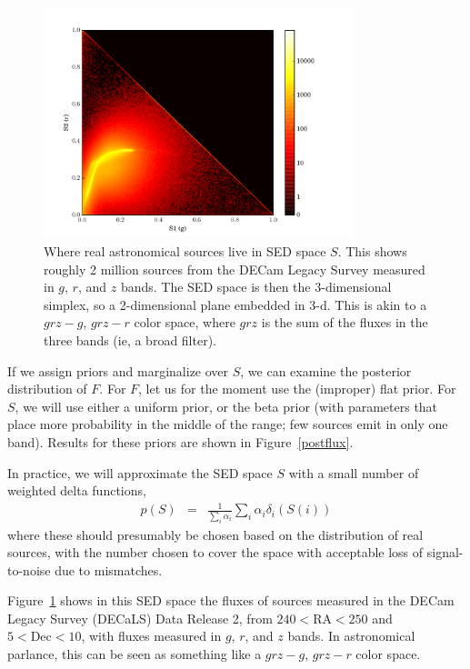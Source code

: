 \documentclass[letterpaper,preprint]{aastex}
\newcommand{\fig}{Figure}
\newcommand{\figref}[1]{\mbox{\fig~\ref{#1}}}
\begin{document}
\begin{figure}[p!]
\begin{center}
\includegraphics[width=0.8\textwidth]{bayes-05}
\end{center}
\caption{Where real astronomical sources live in SED space $S$.  This
  shows roughly 2 million sources from the DECam Legacy Survey
  measured in $g$, $r$, and $z$ bands.  The SED space is then the
  3-dimensional simplex, so a 2-dimensional plane embedded in 3-d.
  This is akin to a $grz - g$, $grz - r$ color space, where $grz$ is
  the sum of the fluxes in the three bands (ie, a broad filter).
  \label{Sgrz}}
\end{figure}



If we assign priors and marginalize over $S$, we can examine the
posterior distribution of $F$.  For $F$, let us for the moment use the
(improper) flat prior.  For $S$, we will use either a uniform prior,
or the beta prior (with parameters that place more probability in the
middle of the range; few sources emit in only one band).  Results for
these priors are shown in \figref{postflux}.


In practice, we will approximate the SED space $S$ with a small number
of weighted delta functions,
\begin{eqnarray}
p(S) &=& \frac{1}{\sum_i \alpha_i} \sum_i \alpha_i \delta_i(S(i))
\end{eqnarray}
where these should presumably be chosen based on the distribution of
real sources, with the number chosen to cover the space with
acceptable loss of signal-to-noise due to mismatches.

\figref{Sgrz} shows in this SED space the fluxes of sources measured
in the DECam Legacy Survey (DECaLS) Data Release 2, from $240 <
\textrm{RA} < 250$ and $5 < \textrm{Dec} < 10$, with fluxes measured
in $g$, $r$, and $z$ bands.  In astronomical parlance, this can be
seen as something like a $grz - g$, $grz - r$ color space.
\end{document}
